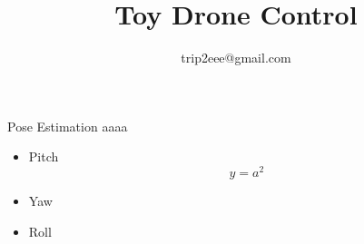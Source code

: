 \documentclass[11pt]{beamer}
\author{trip2eee@gmail.com}
\title{Toy Drone Control}
\begin{document}
\begin{frame}
\titlepage
\end{frame}

\begin{frame}
\tableofcontents
\end{frame}

\begin{frame}{Pose Estimation}
aaaa
\begin{itemize}
\item Pitch
$$ y = a^2 $$
\item Yaw
\item Roll
\end{itemize}
\end{frame}
\end{document}
